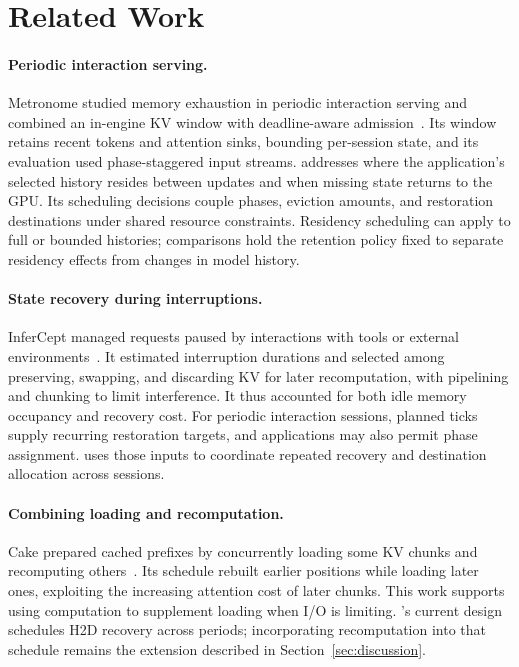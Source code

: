 \section{Related Work}
\label{sec:related}

\paragraph{Periodic interaction serving.}
Metronome studied memory exhaustion in periodic interaction serving and combined an in-engine KV window with deadline-aware admission~\cite{meng2026metronome}.
Its window retains recent tokens and attention sinks, bounding per-session state, and its evaluation used phase-staggered input streams.
\systemname addresses where the application's selected history resides between updates and when missing state returns to the GPU.
Its scheduling decisions couple phases, eviction amounts, and restoration destinations under shared resource constraints.
Residency scheduling can apply to full or bounded histories; comparisons hold the retention policy fixed to separate residency effects from changes in model history.

\paragraph{State recovery during interruptions.}
InferCept managed requests paused by interactions with tools or external environments~\cite{abhyankar2024infercept}.
It estimated interruption durations and selected among preserving, swapping, and discarding KV for later recomputation, with pipelining and chunking to limit interference.
It thus accounted for both idle memory occupancy and recovery cost.
For periodic interaction sessions, planned ticks supply recurring restoration targets, and applications may also permit phase assignment.
\systemname uses those inputs to coordinate repeated recovery and destination allocation across sessions.

\paragraph{Combining loading and recomputation.}
Cake prepared cached prefixes by concurrently loading some KV chunks and recomputing others~\cite{jin2025cake}.
Its schedule rebuilt earlier positions while loading later ones, exploiting the increasing attention cost of later chunks.
This work supports using computation to supplement loading when I/O is limiting.
\systemname's current design schedules H2D recovery across periods; incorporating recomputation into that schedule remains the extension described in Section~\ref{sec:discussion}.


